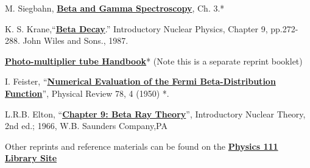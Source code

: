 \documentclass{../lab}
\begin{document}
\begin{thebibliography}{}
\label{sec:References}
     M. Siegbahn, \href{http://physics111.lib.berkeley.edu/Physics111/Reprints/BRA/02-Beta\_Ray\_Spectrometer.pdf}{\textbf{Beta and Gamma Spectroscopy}}, Ch. 3.*

     K. S. Krane,``\href{http://physics111.lib.berkeley.edu/Physics111/Reprints/BRA/03-Beta\_Decay.pdf}{\textbf{Beta Decay}}.'' Introductory Nuclear Physics, Chapter 9, pp.272-288. John Wiles and Sons., 1987.

     \href{http://physics111.lib.berkeley.edu/Physics111/Equipment\_Manuals/RCA\_PMT.pdf}{\textbf{Photo-multiplier tube Handbook}}* (Note this is a separate reprint booklet)

     I. Feister, ``\href{http://prola.aps.org/abstract/PR/v78/i4/p375\_1}{\textbf{Numerical Evaluation of the Fermi Beta-Distribution Function}}'', Physical Review 78, 4 (1950) *\*.

     L.R.B. Elton, ``\href{http://physics111.lib.berkeley.edu/Physics111/Reprints/BRA/Elton\_Nuclear\%20Theory\%20Ch.\%209\%20Beta\%20Decay.pdf}{\textbf{Chapter 9: Beta Ray Theory}}'', Introductory Nuclear Theory, 2nd ed.; 1966, W.B. Saunders Company,PA
\end{thebibliography}

Other reprints and reference materials can be found on the \href{http://physics111.lib.berkeley.edu/Physics111/Reprints/BRA/BRA\_index.html}{\textbf{Physics 111 Library Site}}
\end{document}
